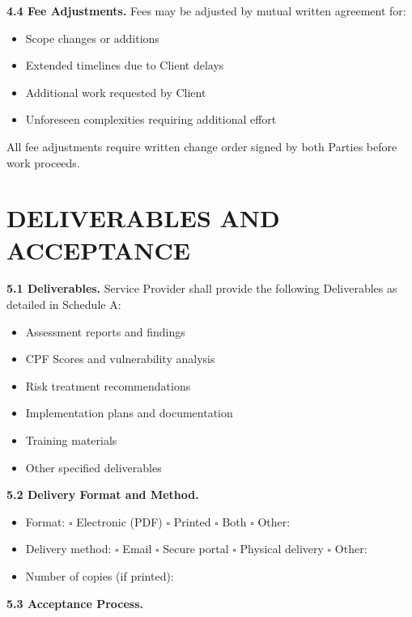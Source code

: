 \documentclass[11pt,a4paper]{article}
\begin{document}
\textbf{4.4 Fee Adjustments.} Fees may be adjusted by mutual written agreement for:
\begin{itemize}
\item Scope changes or additions
\item Extended timelines due to Client delays
\item Additional work requested by Client
\item Unforeseen complexities requiring additional effort
\end{itemize}

All fee adjustments require written change order signed by both Parties before work proceeds.

\section{DELIVERABLES AND ACCEPTANCE}

\textbf{5.1 Deliverables.} Service Provider shall provide the following Deliverables as detailed in Schedule A:

\begin{itemize}
\item Assessment reports and findings
\item CPF Scores and vulnerability analysis
\item Risk treatment recommendations
\item Implementation plans and documentation
\item Training materials
\item Other specified deliverables
\end{itemize}

\textbf{5.2 Delivery Format and Method.}
\begin{itemize}
\item Format: $\square$ Electronic (PDF) $\square$ Printed $\square$ Both $\square$ Other: \underline{\hspace{4cm}}
\item Delivery method: $\square$ Email $\square$ Secure portal $\square$ Physical delivery $\square$ Other: \underline{\hspace{3cm}}
\item Number of copies (if printed): \underline{\hspace{3cm}}
\end{itemize}

\textbf{5.3 Acceptance Process.}
\end{document}
